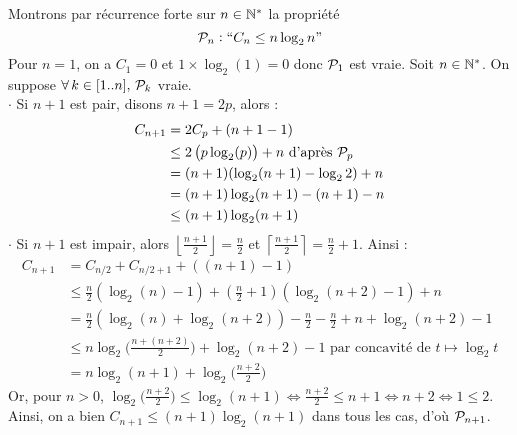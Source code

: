 		\eqskip{3mm}
		\begin{Preuve}
			Montrons par récurrence forte sur \( n \in \bb{N}^* \) la propriété
			\[
				\cal{P}_n : \text{``} C_n \leq n \log_2 n \text{''}
			\]
			\bdot Pour \( n = 1 \), on a \( C_1 = 0 \) et \( 1 \times \log_2 (1) = 0 \) donc \( \cal{P}_1 \) est vraie. \eqskip{2mm} \nt
			\bdot Soit \( n \in \bb{N}^* \). On suppose \( \forall \, k \in [1..n], \, \cal{P}_k \) vraie. \\
				\(\cdot\) Si \( n + 1 \) est pair, disons \( n + 1 = 2p \), alors :
				\begin{align*}
					C_{n+1} & = 2 C_p + (n + 1 - 1) \\
					& \leq 2 \left( p \log_2 (p) \right) + n \text{ d'après \(\cal{P}_p\)} \\
					& = ({n+1})(\log_2 (n+1) - \log_2 2) + n \\
					& = (n+1) \log_2 (n+1) - (n+1) - n \\
					& \leq (n+1) \log_2 (n+1)
				\end{align*}
				\(\cdot\) Si \(n+1\) est impair, alors \(\displaystyle \left\lfloor \frac{n+1}{2} \right\rfloor = \frac{n}{2}\) et \(\displaystyle\left\lceil \frac{n+1}{2} \right\rceil =  \frac{n}{2} + 1 \). Ainsi :
					\begin{align*}
						C_{n+1} & = C_{n/2} + C_{n/2 +1} + ((n+1) -1) \\
						& \leq \frac{n}{2}(\log_2(n) - 1) + \left(\frac{n}{2}+1\right)(\log_2(n+2) -1) + n \\
						& = \frac{n}{2}(\log_2(n) + \log_2(n+2)) - \frac{n}{2} - \frac{n}{2} + n + \log_2(n+2) - 1 \\
						& \leq n\log_2\Big(\frac{n+(n+2)}{2}\Big) + \log_2(n+2) -1\text{ par concavité de \(t \mapsto \log_2 t\)} \\[-1mm]
						& = n\log_2 (n+1) + \log_2\Big(\frac{n+2}{2}\Big)
					\end{align*}
				Or, pour \(n > 0\),	\(\displaystyle
						\log_2\Big(\frac{n+2}{2}\Big) \leq \log_2(n+1) \iff \frac{n+2}{2} \leq n+1 \iff n+2 \iff 1 \leq 2\). \nt
		Ainsi, on a bien \(C_{n+1} \leq (n+1)\log_2(n+1)\) dans tous les cas, d'où \(\cal{P}_{n+1}\).
				\end{Preuve}
